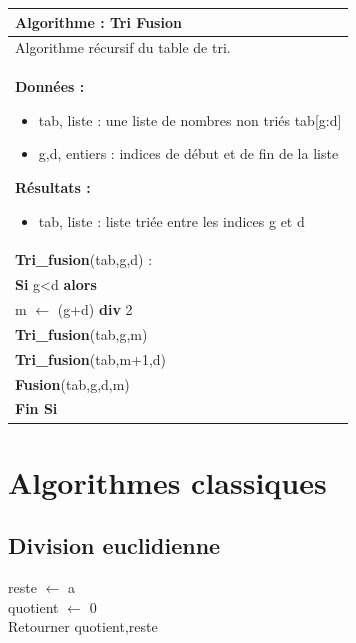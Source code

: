 \documentclass[10pt]{article}
\begin{document}
\begin{pseudo}
\begin{center}
\begin{tabular}{p{}}
\hline
\textbf{Algorithme :} Tri Fusion \\
\hline
Algorithme récursif du table de tri. \\
\textbf{Données :}
\begin{itemize}
\item \textsf{tab}, liste : une liste de nombres non triés \textsf{tab[g:d]} 
\item \textsf{g,d}, entiers : indices de début et de fin de la liste
\end{itemize}
\textbf{Résultats :} 
\begin{itemize}
\item \textsf{tab}, liste : liste triée entre les indices \textsf{g} et \textsf{d}
\end{itemize}
\\
\textbf{Tri\_fusion}(\textsf{tab,g,d}) :\\
\hspace{.4cm} \textbf{Si} \textsf{g<d}  \textbf{alors} \\
\hspace{.8cm} \textsf{m $\leftarrow$ (g+d)} \textbf{div} 2\\
\hspace{.8cm} \textbf{Tri\_fusion}(tab,g,m) \\
\hspace{.8cm} \textbf{Tri\_fusion}(tab,m+1,d) \\
\hspace{.8cm} \textbf{Fusion}(tab,g,d,m) \\
\hspace{.4cm}  \textbf{Fin Si}\\
\hline
\end{tabular}
\end{center}
\end{pseudo}

\section{Algorithmes classiques}
\subsection{Division euclidienne}
\begin{pseudo}
\begin{algorithm}[H]
reste $\gets$ a\\
quotient $\gets$ 0\\
Retourner quotient,reste
\end{algorithm}
\end{pseudo}
\end{document}
